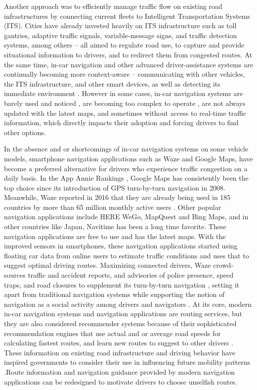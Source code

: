 Another approach was to efficiently manage traffic flow on existing road infrastructures by connecting current fleets to Intelligent Transportation Systems (ITS). Cities have already invested heavily on ITS infrastructure such as toll gantries, adaptive traffic signals, variable-message signs, and traffic detection systems, among others -- all aimed to regulate road use, to capture and provide situational information to drivers, and to redirect them from congested routes. At the same time, in-car navigation and other advanced driver-assistance systems are continually becoming more context-aware -- communicating with other vehicles, the ITS infrastructure, and other smart devices, as well as detecting its immediate environment \cite{Alghamdi2012, Monreal2014, Ali2018}. However in some cases,  in-car navigation systems are barely used and noticed \cite{J.D.Power2012VehicleDeclines}, are becoming too complex to operate \cite{J.D.Power2017ImprovementsFinds}, are not always updated with the latest maps, and sometimes without access to real-time traffic information, which directly impacts their adoption and forcing drivers to find other options.

In the absence and or shortcomings of in-car navigation systems on some vehicle models, smartphone navigation applications such as Waze and Google Maps, have become a preferred alternative for drivers who experience traffic congestion on a daily basis. In the App Annie Rankings \cite{2018GoogleAnnieb}, Google Maps has consistently been the top choice since its introduction of GPS turn-by-turn navigation in 2008. Meanwhile, Waze reported in 2016 that they are already being used in 185 countries by more than 65 million monthly active users \cite{Waze2016DriverIndex}. Other popular navigation applications include HERE WeGo, MapQuest and Bing Maps, and in other countries like Japan, Navitime has been a long time favorite. These navigation applications are free to use and has the latest maps. With the improved sensors in smartphones, these navigation applications started using floating car data from online users to estimate traffic conditions and uses that to suggest optimal driving routes. Maximizing connected drivers, Waze crowd-sources traffic and accident reports, and advisories of police presence, speed traps, and road closures to supplement its turn-by-turn navigation \cite{Levine2014SystemExchange, Valdes-Dapena2016MostDirections}, setting it apart from traditional navigation systems while supporting the notion of navigation as a social activity among drivers and navigators \cite{Forlizzi2010WhereTurn}. At its core, modern in-car navigation systems and navigation applications are routing services, but they are also considered recommender systems because of their sophisticated recommendation engines that use actual and or average road speeds for calculating fastest routes, and learn new routes to suggest to other drivers \cite{2018RoutingServer}. These information on existing road infrastructure and driving behavior have inspired governments to consider their use in influencing future mobility patterns \cite{Ben-Elia2015ResponseReview,Attard2016TheSystems}.Route information and navigation guidance provided by modern navigation applications can be redesigned to motivate drivers to choose unselfish routes.

